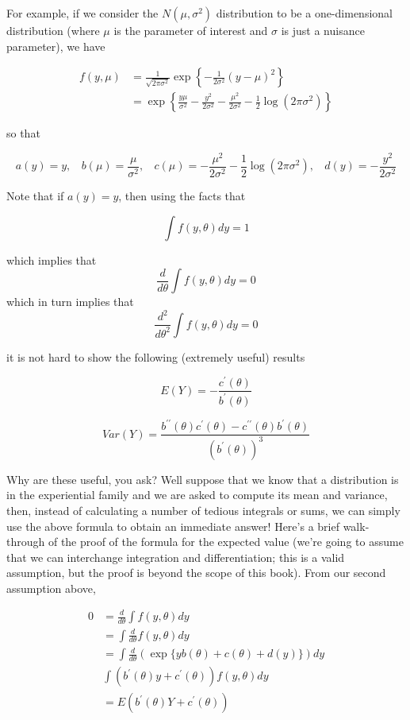 For example, if we consider the $N(\mu, \sigma^2)$ distribution to be a one-dimensional distribution (where $\mu$ is the parameter of interest and $\sigma$ is just a nuisance parameter), we have

\begin{align*}
f(y, \mu) &= \frac{1}{\sqrt{2\pi\sigma^2}} \exp\left\{ - \frac{1}{2\sigma^2}(y - \mu)^2 \right\} \\
&= \exp\left\{ \frac{y\mu}{\sigma^2}  -\frac{y^2}{2\sigma^2} - \frac{\mu^2}{2\sigma^2} - \frac{1}{2}\log(2 \pi \sigma^2) \right\}
\end{align*}

so that

$$a(y) = y, ~~~~b(\mu) = \frac{\mu}{\sigma^2}, ~~~~ c(\mu) = - \frac{\mu^2}{2\sigma^2} - \frac{1}{2} \log(2 \pi \sigma^2), ~~~~ d(y) = - \frac{y^2}{2\sigma^2}$$


Note that if $a(y) = y$, then using the facts that 

$$\int f(y, \theta) dy = 1$$

which implies that 
$$\frac{d}{d\theta} \int f(y, \theta) dy = 0$$
which in turn implies that
$$\frac{d^2}{d\theta^2} \int f(y, \theta) dy = 0$$

it is not hard to show the following (extremely useful) results

$$E(Y) = - \frac{c^\prime(\theta)}{b^\prime(\theta)}$$

$$Var(Y) = \frac{b^{\prime \prime}(\theta) c^\prime(\theta) - c^{\prime \prime}(\theta)b^\prime(\theta)}{\left(b^\prime(\theta)\right)^3}$$

Why are these useful, you ask? Well suppose that we know that a distribution is in the experiential family and we are asked to compute its mean and variance, then, instead of calculating a number of tedious integrals or sums, we can simply use the above formula to obtain an immediate answer! Here's a brief walk-through of the proof of the formula for the expected value (we're going to assume that we can interchange integration and differentiation; this is a valid assumption, but the proof is beyond the scope of this book). From our second assumption above,

\begin{align*}
0 &= \frac{d}{d\theta} \int f(y, \theta) dy \\
& = \int \frac{d}{d\theta}  f(y, \theta) dy \\
& = \int \frac{d}{d\theta} \left( \exp \{y b(\theta) + c(\theta) + d(y) \} \right) dy\\
& \int \left( b^\prime(\theta) y + c^\prime(\theta) \right) f(y, \theta) dy\\
& = E\left( b^\prime(\theta) Y + c^\prime(\theta) \right)
\end{align*}

